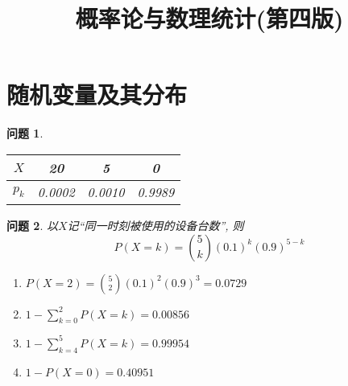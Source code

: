 \documentclass[a4paper]{article}
\theoremstyle{mystyle}
\newtheorem{prob}{问题}[section]
\begin{document}
	\title{\huge \heiti 概率论与数理统计(第四版)}
	\maketitle
	\setcounter{section}{1}
	\section{\heiti 随机变量及其分布}
	\begin{prob}
		\begin{tabular}{c|ccc}
		$X$ & 20 & 5 & 0\\
		\hline
		$p_k$ & 0.0002 & 0.0010 & 0.9989
		\end{tabular}
	\end{prob}
	\setcounter{prob}{5}
	\begin{prob}
		以$X$记``同一时刻被使用的设备台数'', 则
		\[
			P(X=k)={5\choose k}(0.1)^k(0.9)^{5-k}
		\]
		\begin{enumerate}[{(}1{)}]
			\item
			$\displaystyle P(X=2)={5\choose 2}(0.1)^2(0.9)^{3}=0.0729$
			\item
			$\displaystyle 1-\sum_{k=0}^2P(X=k)=0.00856$
			\item
			$\displaystyle 1-\sum_{k=4}^5 P(X=k)=0.99954$
			\item
			$\displaystyle 1-P(X=0)=0.40951$
		\end{enumerate}
	\end{prob}
\end{document}
